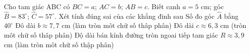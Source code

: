 
\begin{ex}%
	Cho tam  giác ABC có $BC=a$; $AC=b$; $AB=c$. Biết canh $a=5$ cm; góc $\widehat{B}=83^{\circ}$; $\widehat{C}=57^{\circ}$. Xét tính đúng sai của các khẳng đinh sau
	\choiceTF 
		{\True Số đo góc  $\widehat{A}$ bằng $40^{\circ}$}
		{\True Đô dài $b \approx 7{,}7$ cm (làm tròn môt  chữ số thâp phân)}
		 {Đô dài $c \approx 6{,}3$ cm (tròn môt chữ số thâp phân)}
		{\True Độ dài bán kính đường tròn ngoai tiếp tam giác $R\approx  3{,}9$ cm (làm tròn môt chữ số thập phân)}
\end{ex}


